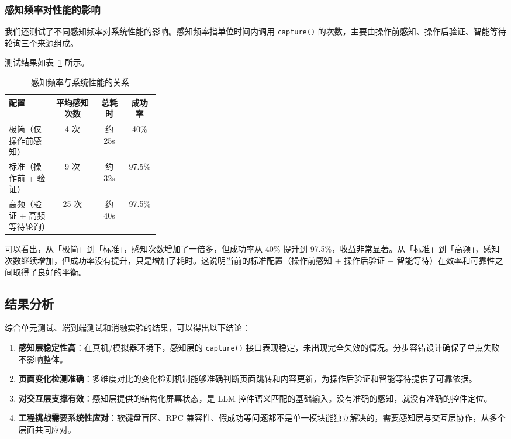 \documentclass{article}
\begin{document}
\begin{CJK}{UTF8}{gbsn}
\subsubsection{感知频率对性能的影响}

我们还测试了不同感知频率对系统性能的影响。感知频率指单位时间内调用 \texttt{capture()} 的次数，主要由操作前感知、操作后验证、智能等待轮询三个来源组成。

测试结果如表~\ref{tab:perception_freq} 所示。

\begin{table}[h]
  \centering
  \caption{感知频率与系统性能的关系}
  \label{tab:perception_freq}
  \begin{tabular}{p{0.3\linewidth}ccc}
    \toprule
    配置 & 平均感知次数 & 总耗时 & 成功率 \\
    \midrule
    极简（仅操作前感知） & 4 次 & 约 25s & 40\% \\
    标准（操作前 + 验证） & 9 次 & 约 32s & 97.5\% \\
    高频（验证 + 高频等待轮询） & 25 次 & 约 40s & 97.5\% \\
    \bottomrule
  \end{tabular}
\end{table}

可以看出，从「极简」到「标准」，感知次数增加了一倍多，但成功率从 40\% 提升到 97.5\%，收益非常显著。从「标准」到「高频」，感知次数继续增加，但成功率没有提升，只是增加了耗时。这说明当前的标准配置（操作前感知 + 操作后验证 + 智能等待）在效率和可靠性之间取得了良好的平衡。

\subsection{结果分析}

综合单元测试、端到端测试和消融实验的结果，可以得出以下结论：

\begin{enumerate}[leftmargin=1.5em]
  \item \textbf{感知层稳定性高}：在真机/模拟器环境下，感知层的 \texttt{capture()} 接口表现稳定，未出现完全失效的情况。分步容错设计确保了单点失败不影响整体。
  \item \textbf{页面变化检测准确}：多维度对比的变化检测机制能够准确判断页面跳转和内容更新，为操作后验证和智能等待提供了可靠依据。
  \item \textbf{对交互层支撑有效}：感知层提供的结构化屏幕状态，是 LLM 控件语义匹配的基础输入。没有准确的感知，就没有准确的控件定位。
  \item \textbf{工程挑战需要系统性应对}：软键盘盲区、RPC 兼容性、假成功等问题都不是单一模块能独立解决的，需要感知层与交互层协作，从多个层面共同应对。
\end{enumerate}


\end{CJK}
\end{document}
